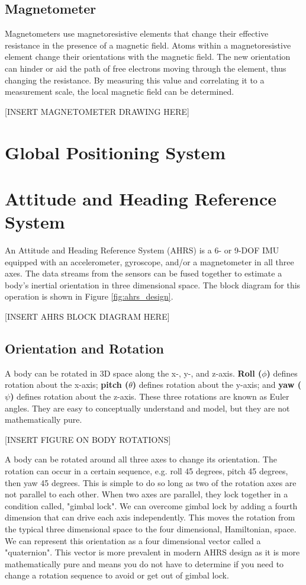 \subsection{Magnetometer} \label{ssec:bkg_magnetometer}
Magnetometers use magnetoresistive elements that change their effective resistance in the presence of a magnetic field.
Atoms within a magnetoresistive element change their orientations with the magnetic field.
The new orientation can hinder or aid the path of free electrons moving through the element, thus changing the resistance.
By measuring this value and correlating it to a measurement scale, the local magnetic field can be determined.

[INSERT MAGNETOMETER DRAWING HERE]

\section{Global Positioning System} \label{sec:bkg_gps}

\section{Attitude and Heading Reference System} \label{sec:bkg_ahrs}
An Attitude and Heading Reference System (AHRS) is a 6- or 9-DOF IMU equipped with an accelerometer, gyroscope, and/or a magnetometer in all three axes.
The data streams from the sensors can be fused together to estimate a body's inertial orientation in three dimensional space.
The block diagram for this operation is shown in Figure \ref{fig:ahrs_design}.

[INSERT AHRS BLOCK DIAGRAM HERE]

\subsection{Orientation and Rotation} \label{ssec:bkg_orientation}
A body can be rotated in 3D space along the x-, y-, and z-axis.
\textbf{Roll ($\phi$)} defines rotation about the x-axis; \textbf{pitch ($\theta$)} defines rotation about the y-axis; and \textbf{yaw ($\psi$)} defines rotation about the z-axis.
These three rotations are known as Euler angles.
They are easy to conceptually understand and model, but they are not mathematically pure.

[INSERT FIGURE ON BODY ROTATIONS]

A body can be rotated around all three axes to change its orientation.
The rotation can occur in a certain sequence, e.g. roll 45 degrees, pitch 45 degrees, then yaw 45 degrees.
This is simple to do so long as two of the rotation axes are not parallel to each other.
When two axes are parallel, they lock together in a condition called, "gimbal lock". 
We can overcome gimbal lock by adding a fourth dimension that can drive each axis independently.
This moves the rotation from the typical three dimensional space to the four dimensional, Hamiltonian, space.
We can represent this orientation as a four dimensional vector called a "quaternion".
This vector is more prevalent in modern AHRS design as it is more mathematically pure and means you do not have to determine if you need to change a rotation sequence to avoid or get out of gimbal lock.

